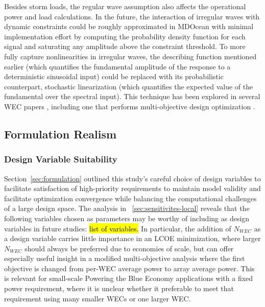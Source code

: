Besides storm loads, the regular wave assumption also affects the operational power and load calculations. In the future, the interaction of irregular waves with dynamic constraints could be roughly approximated in MDOcean with minimal implementation effort by computing the probability density function for each signal and saturating any amplitude above the constraint threshold. To more fully capture nonlinearities in irregular waves, the describing function mentioned earlier (which quantifies the fundamental amplitude of the response to a deterministic sinusoidal input) could be replaced with its probabilistic counterpart, stochastic linearization (which quantifies the expected value of the fundamental over the spectral input). This technique has been explored in several WEC papers \cite{da_silva_statistical_2020,da_silva_stochastic_2023,kluger_synergistic_2017,folley_spectral-domain_2016,spanos_efficient_2016}, including one that performs multi-objective design optimization \cite{neshat_enhancing_2024}.


\subsection{Formulation Realism}
\subsubsection{Design Variable Suitability}
Section~\ref{sec:formulation} outlined this study's careful choice of design variables to facilitate satisfaction of high-priority requirements to maintain model validity and facilitate optimization convergence while balancing the computational challenges of a large design space. The analysis in \sectionautorefname~\ref{sec:sensitivites-local} reveals that the following variables chosen as parameters may be worthy of including as design variables in future studies: \hl{list of variables.} In particular, the addition of $N_{WEC}$ as a design variable carries little importance in an LCOE minimization, where larger $N_{WEC}$ should always be preferred due to economies of scale, but can offer especially useful insight in a modified multi-objective analysis where the first objective is changed from per-WEC average power to array average power. This is relevant for small-scale Powering the Blue Economy applications with a fixed power requirement, where it is unclear whether it preferable to meet that requirement using many smaller WECs or one larger WEC.

